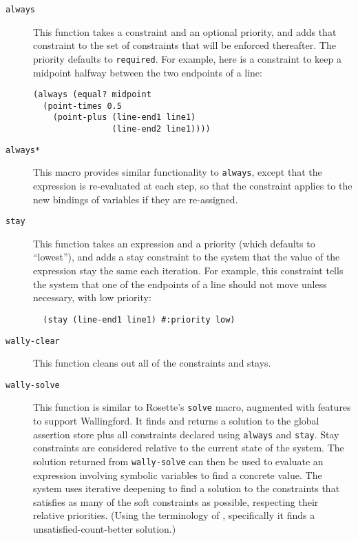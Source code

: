 \documentclass{sig-alternate-05-2015}
\begin{document}
\begin{description}

\item[{\tt always}] This function takes a constraint and an optional
  priority, and adds that constraint to the set of constraints that will be
  enforced thereafter.  The priority defaults to {\tt required}.  For
  example, here is a constraint to keep a midpoint halfway between the two
  endpoints of a line:

\begin{verbatim}
(always (equal? midpoint 
  (point-times 0.5
    (point-plus (line-end1 line1)
                (line-end2 line1))))
\end{verbatim}

\item[{\tt always*}] This macro provides similar functionality to
  \verb|always|, except that the expression is re-evaluated at each
  step, so that the constraint applies to the new bindings of
  variables if they are re-assigned.

\item[{\tt stay}] This function takes an expression and a priority (which
  defaults to ``lowest''), and adds a stay constraint to the system that
  the value of the expression stay the same each iteration.  For example,
  this constraint tells the system that one of the endpoints of a line
  should not move unless necessary, with low priority:

  \begin{verbatim}
  (stay (line-end1 line1) #:priority low)
  \end{verbatim}

\item[{\tt wally-clear}]  This function cleans out all of the constraints
  and stays.

\item[{\tt wally-solve}] This function is similar to Rosette's {\tt solve}
  macro, augmented with features to support Wallingford.  It finds and
  returns a solution to the global assertion store plus all constraints
  declared using \verb|always| and \verb|stay|.  Stay constraints are
  considered relative to the current state of the system.  The solution
  returned from {\tt wally-solve} can then be used to evaluate an
  expression involving symbolic variables to find a concrete value.  The
  system uses iterative deepening to find a solution to the constraints
  that satisfies as many of the soft constraints as possible, respecting
  their relative priorities.  (Using the terminology of
  \cite{borning-lisp-symbolic-computation-1992}, specifically it finds a
  unsatisfied-count-better solution.)

\end{description}
\end{document}
